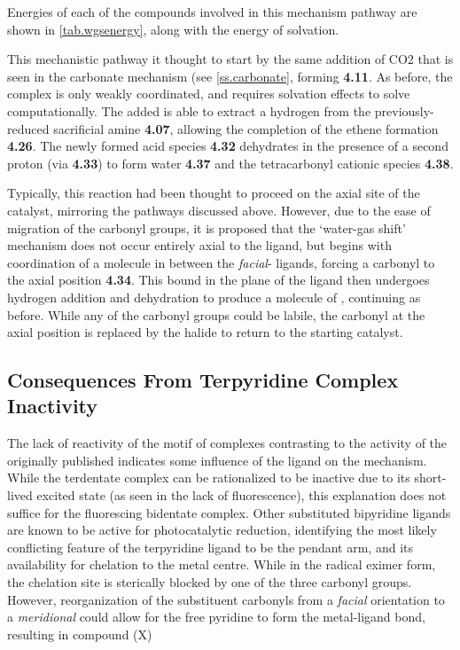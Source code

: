 Energies of each of the compounds involved in this mechanism pathway are shown in \autoref{tab.wgsenergy}, along with the energy of solvation.




This mechanistic pathway it thought to start by the same addition of CO2 that is seen in the carbonate mechanism (see \autoref{ss.carbonate}, forming \textbf{4.11}.  As before, the complex is only weakly coordinated, and requires solvation effects to solve computationally. The added  is able to extract a hydrogen from the previously-reduced sacrificial amine \textbf{4.07}, allowing the completion of the ethene formation \textbf{4.26}. The newly formed acid species \textbf{4.32} dehydrates in the presence of a second proton (via \textbf{4.33}) to form water \textbf{4.37} and the tetracarbonyl cationic species \textbf{4.38}. 

Typically, this reaction had been thought to proceed on the axial site of the catalyst, mirroring the pathways discussed above. However, due to the ease of migration of the carbonyl groups, it is proposed that the `water-gas shift' mechanism does not occur entirely axial to the ligand, but begins with coordination of a  molecule in between the \textit{facial}- ligands, forcing a carbonyl to the axial position \textbf{4.34}. This  bound in the plane of the ligand then undergoes hydrogen addition and dehydration to produce a molecule of , continuing as before. While any of the carbonyl groups could be labile, the carbonyl at the axial position is replaced by the halide to return to the starting catalyst\autocite{shaver1992}. 

\FloatBarrier

\subsection{Consequences From \texorpdfstring{}{Bidentate} Terpyridine Complex Inactivity}

The lack of reactivity of the  motif of complexes contrasting to the activity of the originally published  indicates some influence of the ligand on the mechanism. While the terdentate complex can be rationalized to be inactive due to its short-lived excited state (as seen in the lack of fluorescence), this explanation does not suffice for the fluorescing bidentate complex. Other substituted bipyridine ligands are known to be active for photocatalytic reduction, identifying the most likely conflicting feature of the terpyridine ligand to be the pendant arm, and its availability for chelation to the metal centre. While in the radical eximer form, the chelation site is sterically blocked by one of the three carbonyl groups. However, reorganization of the substituent carbonyls from a \textit{facial} orientation to a \textit{meridional} could allow for the free pyridine to form the metal-ligand bond, resulting in compound (X)

